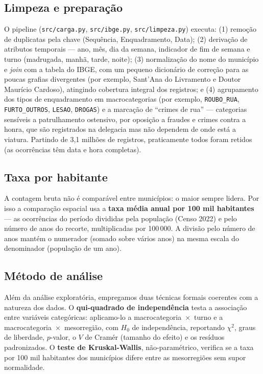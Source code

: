 \documentclass[a4paper,11pt]{article}
\begin{document}
\subsection{Limpeza e preparação}
O pipeline (\texttt{src/carga.py}, \texttt{src/ibge.py}, \texttt{src/limpeza.py})
executa: (1) remoção de duplicatas pela chave (Sequência, Enquadramento, Data);
(2) derivação de atributos temporais --- ano, mês, dia da semana, indicador de
fim de semana e turno (madrugada, manhã, tarde, noite); (3) normalização do nome
do município e \emph{join} com a tabela do IBGE, com um pequeno dicionário de
correção para as poucas grafias divergentes (por exemplo, Sant'Ana do Livramento
e Doutor Maurício Cardoso), atingindo cobertura integral dos registros; e (4)
agrupamento dos tipos de enquadramento em macrocategorias (por exemplo,
\texttt{ROUBO\_RUA}, \texttt{FURTO\_OUTROS}, \texttt{LESAO}, \texttt{DROGAS}) e a
marcação de ``crimes de rua'' --- categorias sensíveis a patrulhamento ostensivo,
por oposição a fraudes e crimes contra a honra, que são registrados na delegacia
mas não dependem de onde está a viatura. Partindo de 3,1 milhões de registros,
praticamente todos foram retidos (as ocorrências têm data e hora completas).

\subsection{Taxa por habitante}
A contagem bruta não é comparável entre municípios: o maior sempre lidera. Por
isso a comparação espacial usa a \textbf{taxa média anual por 100 mil
habitantes} --- as ocorrências do período divididas pela população (Censo 2022) e
pelo número de anos do recorte, multiplicadas por 100\,000. A divisão pelo número
de anos mantém o numerador (somado sobre vários anos) na mesma escala do
denominador (população de um ano).

\subsection{Método de análise}
Além da análise exploratória, empregamos duas técnicas formais coerentes com a
natureza dos dados. O \textbf{qui-quadrado de independência} testa a associação
entre variáveis categóricas: aplicamo-lo a macrocategoria~$\times$~turno e a
macrocategoria~$\times$~mesorregião, com $H_0$ de independência, reportando
$\chi^2$, graus de liberdade, $p$-valor, o $V$ de Cramér (tamanho do efeito) e os
resíduos padronizados. O \textbf{teste de Kruskal-Wallis}, não-paramétrico,
verifica se a taxa por 100 mil habitantes dos municípios difere entre as
mesorregiões sem supor normalidade.
\end{document}
